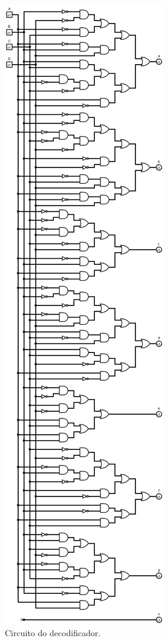\documentclass[
	12pt,				%
	openright,			%
	twoside,			%
	a4paper,			%
	english,			%
	french,				%
	spanish,			%
	brazil,				%
	]{abntex2}
\begin{document}
\begin{figure}[H]
	\begin{center}
	    \includegraphics[scale=0.3]{decode.png}
	\end{center}
\caption{\label{decode}Circuito do decodificador.}
\end{figure}
\end{document}
